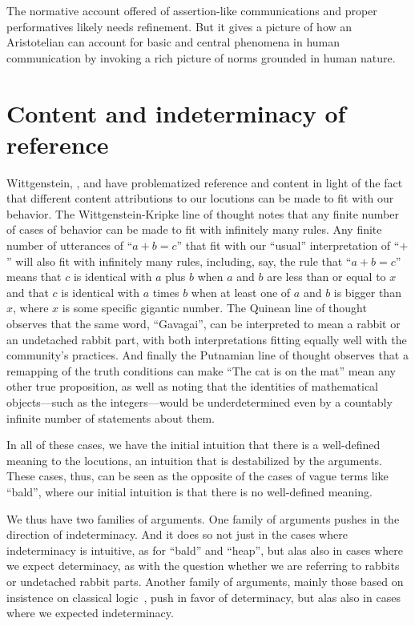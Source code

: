 The normative account offered of assertion-like communications and proper performatives likely needs refinement.
But it gives a picture of how an Aristotelian can account for basic and central phenomena in human communication
by invoking a rich picture of norms grounded in human nature.

\section{Content and indeterminacy of reference}\label{sec:indet-ref}
Wittgenstein, ,  and  have problematized reference and content in light of the fact that different
content attributions to our locutions can be made to fit with our behavior. The Wittgenstein-Kripke line of thought notes
that any finite number of cases of behavior can be made to fit with infinitely many rules. Any finite number of utterances
of ``$a+b=c$'' that fit with our ``usual'' interpretation of ``$+$'' will also fit with infinitely many rules, including,
say, the rule that ``$a+b=c$'' means that $c$ is identical with $a$ plus $b$ 
when $a$ and $b$ are less than or equal to $x$ and 
that $c$ is identical with $a$ times $b$ when at least one of $a$ and $b$ is bigger than $x$, where $x$ is some specific gigantic number. The Quinean line of thought observes that the same word, ``Gavagai'',
can be interpreted to mean a rabbit or an undetached rabbit part, with both interpretations fitting equally well with the
community's practices. And finally the Putnamian line of thought observes that a remapping of the truth conditions can make
``The cat is on the mat'' mean any other true proposition, as well as noting that the identities of mathematical objects---such as
the integers---would be underdetermined even by a countably infinite number of statements about them. 

In all of these cases, we have the initial intuition that there is a well-defined meaning to the locutions, an intuition that
is destabilized by the arguments. These cases, thus, can be seen as the opposite of the cases of vague terms like ``bald'', where
our initial intuition is that there is no well-defined meaning.

We thus have two families of arguments. One family of arguments pushes in the direction of indeterminacy. And it does so not
just in the cases where indeterminacy is intuitive, as for ``bald'' and ``heap'', but alas also in cases where we expect determinacy,
as with the question whether we are referring to rabbits or undetached rabbit parts. Another family of arguments, mainly those
based on insistence on classical logic~, push in favor of determinacy, but alas also in cases where we expected indeterminacy.

